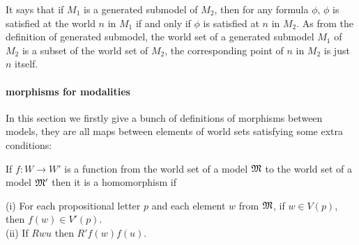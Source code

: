 \documentclass[letterpaper]{article}
\renewcommand{\HOLinline}[1]{\ensuremath{#1}}
\begin{document}
It says that if $M_1$ is a generated submodel of $M_2$, then for any formula $\phi$, $\phi$ is satisfied at the world $n$ in $M_1$ if and only if $\phi$ is satisfied at $n$ in $M_2$. As from the definition of generated submodel, the world set of a generated submodel $M_1$ of $M_2$ is a subset of the world set of $M_2$, the corresponding point of $n$ in $M_2$ is just $n$ itself.

\paragraph{morphisms for modalities}

In this section we firstly give a bunch of definitions of morphisms between models, they are all maps between elements of world sets satisfying some extra conditions:

If $f:W\to W'$ is a function from the world set of a model \HOLinline{\HOLFreeVar{\ensuremath{\mathfrak{M}}}} to the world set of a model \HOLinline{\HOLFreeVar{\ensuremath{\mathfrak{M}'}}} then it is a homomorphism if

(i) For each propositional letter $p$ and each element $w$ from \HOLinline{\HOLFreeVar{\ensuremath{\mathfrak{M}}}}, if $w\in V(p)$, then $f(w) \in V'(p)$.\\
(ii) If $Rwu$ then $R'f(w)f(u)$.
\end{document}

